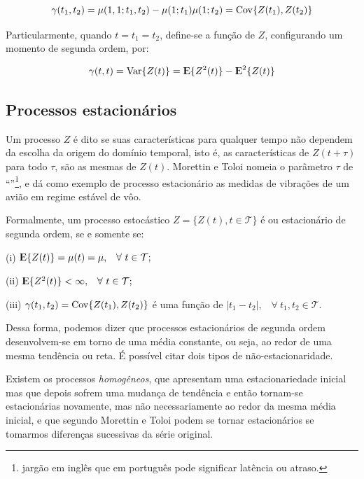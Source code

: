 \begin{equation}\label{series:2.6}
\gamma(t_1, t_2) = \mu(1,1; t_1,t_2) - \mu(1; t_1)\mu(1; t_2) = \mathrm{Cov}\{Z(t_1),Z(t_2)\}
\end{equation}

Particularmente, quando $t = t_1 = t_2$, define-se a função  de $Z$, configurando um momento de segunda ordem, por:

\begin{equation}\label{series:2.7}
\gamma(t, t) = \mathrm{Var}\{Z(t)\} = {\rm I\kern-.3em E}\{Z^2(t)\} - {\rm I\kern-.3em E}^2\{Z(t)\}
\end{equation}

\subsection{Processos estacionários}

Um processo $Z$ é dito  se suas características para qualquer tempo não dependem da escolha da origem do domínio temporal, isto é, as características de $Z(t + \tau)$ para todo $\tau$, são as mesmas de $Z(t)$. Morettin e Toloi \citep{morettin} nomeia o parâmetro $\tau$ de ``''\footnote{jargão em inglês que em português pode significar latência ou atraso.}, e dá como exemplo de processo estacionário as medidas de vibrações de um avião em regime estável de vôo.

Formalmente, um processo estocástico $Z = \{Z(t), t \in \mathcal{T}\}$ é  ou estacionário de segunda ordem, se e somente se:

	(i) ${\rm I\kern-.3em E}\{Z(t)\} = \mu(t) = \mu, \;\;\; \forall ~ t \in \mathcal{T};$

	(ii) ${\rm I\kern-.3em E}\{Z^2(t)\} < \infty, \;\;\; \forall ~ t \in \mathcal{T};$

	(iii) $\gamma(t_1, t_2) = \mathrm{Cov}\{Z(t_1), Z(t_2)\}$ é uma função de $|t_1 - t_2|, \;\;\; \forall~ t_1, t_2 \in \mathcal{T}.$

Dessa forma, podemos dizer que processos estacionários de segunda ordem desenvolvem-se em torno de uma média constante, ou seja, ao redor de uma mesma tendência ou reta. É possível citar dois tipos de não-estacionaridade. 

Existem os processos \emph{homogêneos}, que apresentam uma estacionariedade inicial mas que depois sofrem uma mudança de tendência e então tornam-se estacionárias novamente, mas não necessariamente ao redor da mesma média inicial, e que segundo Morettin e Toloi \citep{morettin} podem se tornar estacionários se tomarmos diferenças sucessivas da série original.

